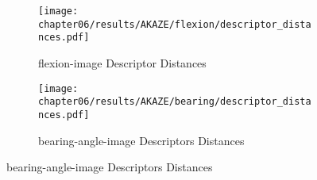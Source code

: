 \begin{figure}[H]
\begin{subfigure}[t]{0.45\linewidth}
    \texttt{[image: chapter06/results/AKAZE/flexion/descriptor\_distances.pdf]}%
    \caption{\gls{flexion-image} Descriptor Distances}
\end{subfigure}\quad
\begin{subfigure}[t]{0.45\linewidth}
    \texttt{[image: chapter06/results/AKAZE/bearing/descriptor\_distances.pdf]}%
    \caption{\gls{bearing-angle-image} Descriptors Distances}
\end{subfigure}
\end{figure}
